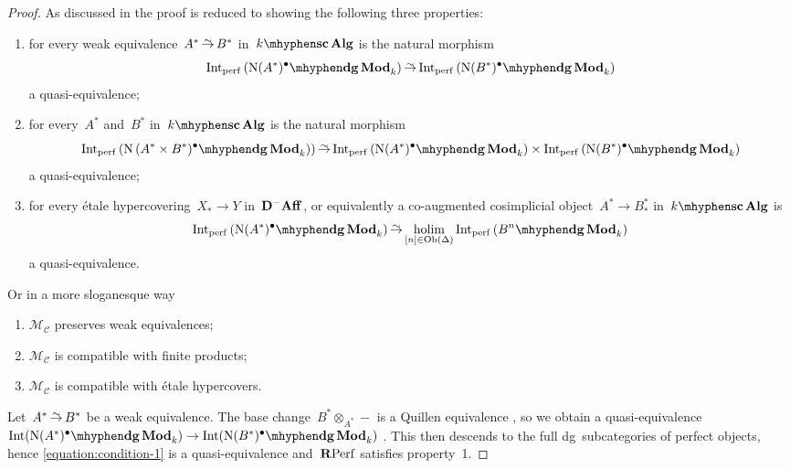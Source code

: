 \begin{refsection}
\begin{theorem}
  \begin{proof}[Proof]
    As discussed in \cite[\S 2.1.1]{hagII} the proof is reduced to showing the following three properties:
    \begin{enumerate}
      \item for every weak equivalence~$A^*\weq B^*$ in~$\scAlg{k}$ is the natural morphism
        \begin{equation}
          \label{equation:condition-1}
          \Int_\perf\left( \dgMod{\nerve(A^*)^\bullet}_k \right)\weq\Int_\perf\left( \dgMod{\nerve(B^*)^\bullet}_k \right)
        \end{equation}
        a quasi-equivalence;
      \item for every~$A^*$ and~$B^*$ in~$\scAlg{k}$ is the natural morphism
        \begin{equation}
          \Int_\perf\left( \dgMod{\nerve\left( A^*\times B^*)^\bullet}_k \right) \right)\weq\Int_\perf\left( \dgMod{\nerve(A^*)^\bullet}_k \right)\times\Int_\perf\left( \dgMod{\nerve(B^*)^\bullet}_k \right)
        \end{equation}
        a quasi-equivalence;
      \item for every \'etale hypercovering~$X_*\to Y$ in~$\mathbf{D}^-\mathbf{Aff}$, or equivalently a co-augmented cosimplicial object~$A^*\to B_*^*$ in~$\scAlg{k}$ is
        \begin{equation}
          \label{equation:condition-3}
          \Int_\perf\left( \dgMod{\nerve(A^*)^\bullet}_k \right)\weq\holim_{[n]\in\Ob(\Delta)}\Int_\perf\left( \dgMod{B^n}_k \right)
        \end{equation}
        a quasi-equivalence.
    \end{enumerate}
    Or in a more sloganesque way
    \begin{enumerate}
      \item $\mathcal{M}_{\mathcal{C}}$ preserves weak equivalences;
      \item $\mathcal{M}_{\mathcal{C}}$ is compatible with finite products;
      \item $\mathcal{M}_{\mathcal{C}}$ is compatible with \'etale hypercovers.
    \end{enumerate}

    
    Let~$A^*\weq B^*$ be a weak equivalence. The base change~$B^*\otimes_{A^*}-$ is a Quillen equivalence \addreference, so we obtain a quasi-equivalence~$\Int(\dgMod{\nerve(A^*)^\bullet}_k)\to\Int(\dgMod{\nerve(B^*)^\bullet}_k)$ \addreference. This then descends to the full dg~subcategories of perfect objects, hence \eqref{equation:condition-1} is a quasi-equivalence and~$\mathbf{R}\mathrm{Perf}$ satisfies property~1.


\end{proof}
\end{theorem}
\end{refsection}
